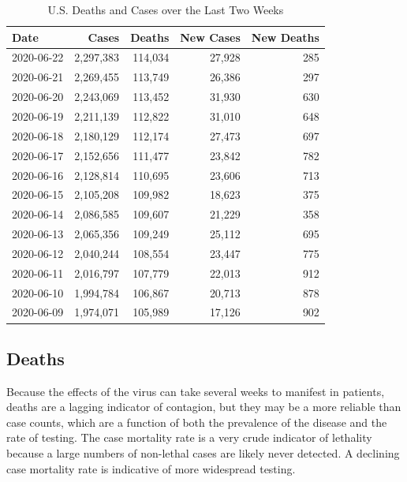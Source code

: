 \documentclass[]{article}
\begin{document}
\begin{table}[!h]

\caption{\label{tab:unnamed-chunk-8}U.S. Deaths and Cases over the Last Two Weeks}
\centering
\begin{tabular}{l|r|r|r|r}
\hline
Date & Cases & Deaths & New Cases & New Deaths\\
\hline
2020-06-22 & 2,297,383 & 114,034 & 27,928 & 285\\
\hline
2020-06-21 & 2,269,455 & 113,749 & 26,386 & 297\\
\hline
2020-06-20 & 2,243,069 & 113,452 & 31,930 & 630\\
\hline
2020-06-19 & 2,211,139 & 112,822 & 31,010 & 648\\
\hline
2020-06-18 & 2,180,129 & 112,174 & 27,473 & 697\\
\hline
2020-06-17 & 2,152,656 & 111,477 & 23,842 & 782\\
\hline
2020-06-16 & 2,128,814 & 110,695 & 23,606 & 713\\
\hline
2020-06-15 & 2,105,208 & 109,982 & 18,623 & 375\\
\hline
2020-06-14 & 2,086,585 & 109,607 & 21,229 & 358\\
\hline
2020-06-13 & 2,065,356 & 109,249 & 25,112 & 695\\
\hline
2020-06-12 & 2,040,244 & 108,554 & 23,447 & 775\\
\hline
2020-06-11 & 2,016,797 & 107,779 & 22,013 & 912\\
\hline
2020-06-10 & 1,994,784 & 106,867 & 20,713 & 878\\
\hline
2020-06-09 & 1,974,071 & 105,989 & 17,126 & 902\\
\hline
\end{tabular}
\end{table}

\newpage

\hypertarget{deaths}{%
\subsection{Deaths}\label{deaths}}

Because the effects of the virus can take several weeks to manifest in
patients, deaths are a lagging indicator of contagion, but they may be a
more reliable than case counts, which are a function of both the
prevalence of the disease and the rate of testing. The case mortality
rate is a very crude indicator of lethality because a large numbers of
non-lethal cases are likely never detected. A declining case mortality
rate is indicative of more widespread testing.
\end{document}

